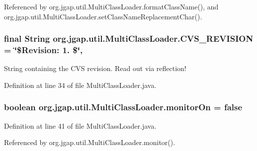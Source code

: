 Referenced by org.\-jgap.\-util.\-Multi\-Class\-Loader.\-format\-Class\-Name(), and org.\-jgap.\-util.\-Multi\-Class\-Loader.\-set\-Class\-Name\-Replacement\-Char().

\hypertarget{classorg_1_1jgap_1_1util_1_1_multi_class_loader_a4de9db8aab4e1d0d25363cf3dd635773}{
\subsubsection[{C\-V\-S\-\_\-\-R\-E\-V\-I\-S\-I\-O\-N}]{\setlength{\rightskip}{0pt plus 5cm}final String org.\-jgap.\-util.\-Multi\-Class\-Loader.\-C\-V\-S\-\_\-\-R\-E\-V\-I\-S\-I\-O\-N = \char`\"{}\$Revision\-: 1. \$\char`\"{}\hspace{0.3cm}{\ttfamily [static]}, {\ttfamily [private]}}}\label{classorg_1_1jgap_1_1util_1_1_multi_class_loader_a4de9db8aab4e1d0d25363cf3dd635773}
String containing the C\-V\-S revision. Read out via reflection! 

Definition at line 34 of file Multi\-Class\-Loader.\-java.

\hypertarget{classorg_1_1jgap_1_1util_1_1_multi_class_loader_a46b81b84025e37993e49b206062260d2}{
\subsubsection[{monitor\-On}]{\setlength{\rightskip}{0pt plus 5cm}boolean org.\-jgap.\-util.\-Multi\-Class\-Loader.\-monitor\-On = false\hspace{0.3cm}{\ttfamily [protected]}}}\label{classorg_1_1jgap_1_1util_1_1_multi_class_loader_a46b81b84025e37993e49b206062260d2}


Definition at line 41 of file Multi\-Class\-Loader.\-java.



Referenced by org.\-jgap.\-util.\-Multi\-Class\-Loader.\-monitor().

